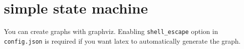 


\section{simple state machine}
\label{sec:org5988ac9}

You can create graphs with graphviz.
Enabling \texttt{shell\_escape} option in \texttt{config.json} is required if you want latex
to automatically generate the graph.



